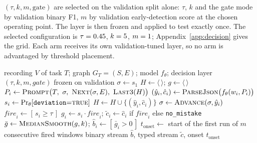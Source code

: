 \documentclass[10pt,twocolumn]{article}
\newcommand{\ourmodel}{\textsc{GraphWalk}}
\begin{document}
$(\tau,k,m,\text{gate})$ are selected on the validation split alone: $\tau$,
$k$ and the gate mode by validation binary F1, $m$ by validation early-detection
score at the chosen operating point. The layer is then frozen and applied to test exactly
once. The selected configuration is $\tau=0.45$, $k=5$, $m=1$;
Appendix~\ref{app:decision} gives the grid.
Each arm receives its own validation-tuned layer, so no arm is advantaged by
threshold placement.


\begin{algorithm}[t]
\small
\caption{\ourmodel{}, one recording. Lines 5--10 are strictly causal: the
prompt, the pointer and the history read only $w_{\le i}$.
\textsc{Advance} is the sole point at which graph state changes, and it is the
only line that differs between the main arm and the corrected-pointer arm
(R11, Section~\ref{sec:graphablation}).}
\label{alg:walk}
\begin{algorithmic}[1]
\Require recording $V$ of task $T$; graph $G_T=(S,E)$; model $f_\theta$;
  decision layer $(\tau,k,m,\textit{gate})$ frozen on validation
\State $\sigma \gets s_1$ 
\State $H \gets \langle\,\rangle$; \; $g \gets \langle\,\rangle$
  \State $P_i \gets \textsc{Prompt}\big(T,\ \sigma,\ \textsc{Next}(\sigma,E),\ \textsc{Last3}(H)\big)$
  \State $(\hat y_i,\hat c_i) \gets \textsc{ParseJson}\big(f_\theta(w_i,P_i)\big)$
  \State $s_i \gets \Pr\nolimits_\theta[\texttt{deviation}{=}\textsc{true}]$
  \State $H \gets H \cup \{(\hat y_i,\hat c_i)\}$
  \State $\sigma \gets \textsc{Advance}(\sigma,\hat y_i)$
  \State $\textit{fire}_i \gets [\,s_i \ge \tau\,]$
  \State $g_i \gets s_i \cdot \textit{fire}_i$; \;
         $\tilde c_i \gets \hat c_i$ if $\textit{fire}_i$ else \texttt{no\_mistake}
\EndFor
\State $\bar g \gets \textsc{MedianSmooth}(g,k)$;\quad
       $\hat b_i \gets [\,\bar g_i > 0\,]$
\State $t_{\text{onset}} \gets$ start of the first run of $m$ consecutive fired windows
\State \Return binary stream $\hat b$, typed stream $\tilde c$, onset $t_{\text{onset}}$
\end{algorithmic}
\end{algorithm}
\end{document}

